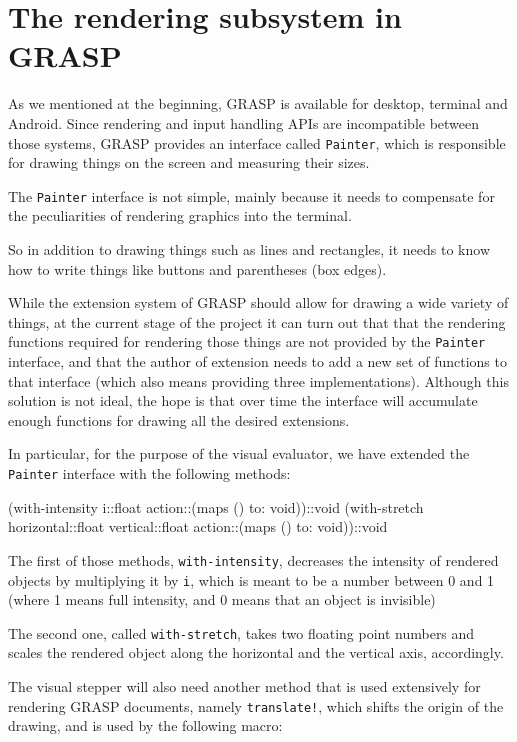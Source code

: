 \documentclass[acmsmall]{acmart}
\newenvironment{Snippet}{\Verbatim[samepage=true]}{\endVerbatim}
\begin{document}
\section{The rendering subsystem in GRASP}

As we mentioned at the beginning, GRASP is available for desktop, terminal
and Android. Since rendering and input handling APIs are incompatible
between those systems, GRASP provides an interface called \texttt{Painter},
which is responsible for drawing things on the screen and measuring their
sizes.

The \texttt{Painter} interface is not simple, mainly because it needs
to compensate for the peculiarities of rendering graphics into the
terminal.

So in addition to drawing things such as lines and rectangles, it
needs to know how to write things like buttons and parentheses (box
edges).

While the extension system of GRASP should allow for drawing a wide
variety of things, at the current stage of the project it can turn out
that that the rendering functions required for rendering those things
are not provided by the \texttt{Painter} interface, and that the
author of extension needs to add a new set of functions to that
interface (which also means providing three implementations). Although
this solution is not ideal, the hope is that over time the interface
will accumulate enough functions for drawing all the desired
extensions.

In particular, for the purpose of the visual evaluator, we have
extended the \texttt{Painter} interface with the following methods:

\begin{Snippet}
(with-intensity i::float action::(maps () to: void))::void
(with-stretch horizontal::float vertical::float action::(maps () to: void))::void
\end{Snippet}

The first of those methods, \texttt{with-intensity}, decreases the
intensity of rendered objects by multiplying it by \texttt{i}, which
is meant to be a number between 0 and 1 (where 1 means full intensity,
and 0 means that an object is invisible)

The second one, called \texttt{with-stretch}, takes two floating point
numbers and scales the rendered object along the horizontal and the
vertical axis, accordingly.

The visual stepper will also need another method that is used
extensively for rendering GRASP documents, namely \texttt{translate!},
which shifts the origin of the drawing, and is used by the following
macro:
\end{document}
